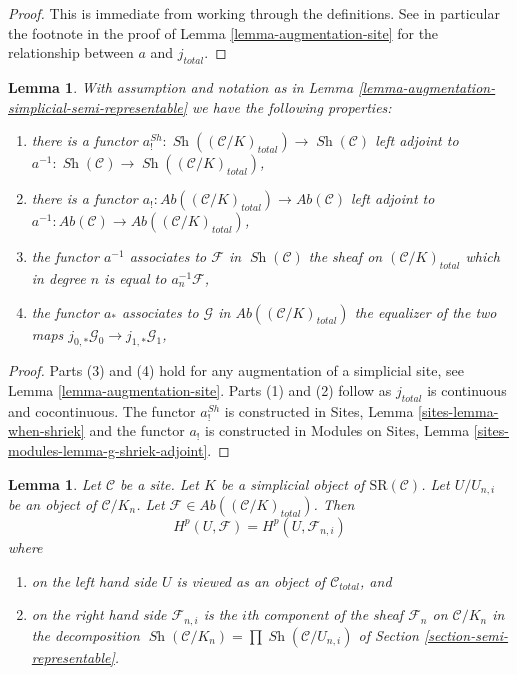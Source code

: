 \documentclass{stacks-project}
\theoremstyle{plain}
\newtheorem{lemma}[subsection]{Lemma}
\theoremstyle{definition}
\theoremstyle{remark}
\numberwithin{equation}{subsection}
\def\Sh{\mathop{\mathit{Sh}}\nolimits}
\begin{document}
\begin{proof}
This is immediate from working through the definitions.
See in particular the footnote in the proof of
Lemma \ref{lemma-augmentation-site}
for the relationship between $a$ and $j_{total}$.
\end{proof}

\begin{lemma}
\label{lemma-comparison}
With assumption and notation as in
Lemma \ref{lemma-augmentation-simplicial-semi-representable}
we have the following properties:
\begin{enumerate}
\item there is a functor
$a^{Sh}_! : \Sh((\mathcal{C}/K)_{total}) \to \Sh(\mathcal{C})$
left adjoint to $a^{-1} : \Sh(\mathcal{C}) \to \Sh((\mathcal{C}/K)_{total})$,
\item there is a functor
$a_! : \textit{Ab}((\mathcal{C}/K)_{total}) \to \textit{Ab}(\mathcal{C})$
left adjoint to
$a^{-1} : \textit{Ab}(\mathcal{C}) \to \textit{Ab}((\mathcal{C}/K)_{total})$,
\item the functor $a^{-1}$ associates to
$\mathcal{F}$ in $\Sh(\mathcal{C})$ the sheaf on $(\mathcal{C}/K)_{total}$
which in degree $n$ is equal to $a_n^{-1}\mathcal{F}$,
\item the functor $a_*$ associates to $\mathcal{G}$ in
$\textit{Ab}((\mathcal{C}/K)_{total})$ the equalizer of the two maps
$j_{0, *}\mathcal{G}_0 \to j_{1, *}\mathcal{G}_1$,
\end{enumerate}
\end{lemma}

\begin{proof}
Parts (3) and (4) hold for any augmentation of a
simplicial site, see Lemma \ref{lemma-augmentation-site}.
Parts (1) and (2) follow as $j_{total}$ is continuous and cocontinuous.
The functor $a^{Sh}_!$ is constructed in
Sites, Lemma \ref{sites-lemma-when-shriek}
and the functor $a_!$ is constructed in
Modules on Sites, Lemma
\ref{sites-modules-lemma-g-shriek-adjoint}.
\end{proof}

\begin{lemma}
\label{lemma-sanity-check-simplicial-semi-representable}
Let $\mathcal{C}$ be a site. Let $K$ be a simplicial object of
$\text{SR}(\mathcal{C})$. Let $U/U_{n, i}$ be an object of
$\mathcal{C}/K_n$. Let
$\mathcal{F} \in \textit{Ab}((\mathcal{C}/K)_{total})$.
Then
$$
H^p(U, \mathcal{F}) = H^p(U, \mathcal{F}_{n, i})
$$
where
\begin{enumerate}
\item on the left hand side $U$ is viewed as an object of
$\mathcal{C}_{total}$, and
\item on the right hand side $\mathcal{F}_{n, i}$ is the $i$th
component of the sheaf $\mathcal{F}_n$ on $\mathcal{C}/K_n$
in the decomposition $\Sh(\mathcal{C}/K_n) = \prod \Sh(\mathcal{C}/U_{n, i})$
of Section \ref{section-semi-representable}.
\end{enumerate}
\end{lemma}
\end{document}
